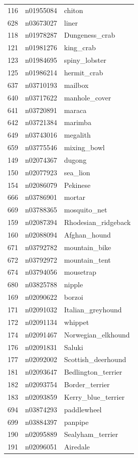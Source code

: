 \begin{table}
\begin{tabular}{cll}
116 & n01955084 & chiton \\
628 & n03673027 & liner \\
118 & n01978287 & Dungeness_crab \\
121 & n01981276 & king_crab \\
123 & n01984695 & spiny_lobster \\
125 & n01986214 & hermit_crab \\
637 & n03710193 & mailbox \\
640 & n03717622 & manhole_cover \\
641 & n03720891 & maraca \\
642 & n03721384 & marimba \\
649 & n03743016 & megalith \\
659 & n03775546 & mixing_bowl \\
149 & n02074367 & dugong \\
150 & n02077923 & sea_lion \\
154 & n02086079 & Pekinese \\
666 & n03786901 & mortar \\
669 & n03788365 & mosquito_net \\
159 & n02087394 & Rhodesian_ridgeback \\
160 & n02088094 & Afghan_hound \\
671 & n03792782 & mountain_bike \\
672 & n03792972 & mountain_tent \\
674 & n03794056 & mousetrap \\
680 & n03825788 & nipple \\
169 & n02090622 & borzoi \\
171 & n02091032 & Italian_greyhound \\
172 & n02091134 & whippet \\
174 & n02091467 & Norwegian_elkhound \\
176 & n02091831 & Saluki \\
177 & n02092002 & Scottish_deerhound \\
181 & n02093647 & Bedlington_terrier \\
182 & n02093754 & Border_terrier \\
183 & n02093859 & Kerry_blue_terrier \\
694 & n03874293 & paddlewheel \\
699 & n03884397 & panpipe \\
190 & n02095889 & Sealyham_terrier \\
191 & n02096051 & Airedale \\

\end{tabular}
\end{table}

